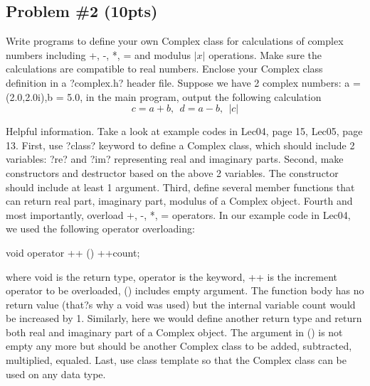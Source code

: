 \documentclass{article}
\begin{document}
\begin{framed} \vspace{-.2in}
\section*{Problem \#2 (10pts)}
Write programs to define your own Complex class for calculations of complex numbers including +, -, *, = and modulus $|x|$ operations. Make sure the calculations are compatible to real numbers. Enclose your Complex class definition in a ?complex.h? header file. Suppose we have 2 complex numbers: a = (2.0,2.0i),b = 5.0, in the main program, output the following calculation
$$c = a + b, ~~ d = a - b, ~~ |c| $$

Helpful information. Take a look at example codes in Lec04, page 15, Lec05, page 13.
First, use ?class? keyword to define a Complex class, which should include 2 variables: ?re? and ?im? representing real and imaginary parts. Second, make constructors and destructor based on the above 2 variables. The constructor should include at least 1 argument. Third, define several member functions that can return real part, imaginary part, modulus of a Complex object.
Fourth and most importantly, overload +, -, *, = operators. In our example code in Lec04, we used the following operator overloading:
\begin{center}
void operator ++ () {++count;}
\end{center}
where void is the return type, operator is the keyword, ++ is the increment operator to be overloaded, () includes empty argument. The function body has no return value (that?s why a void was used) but the internal variable count would be increased by 1.
Similarly, here we would define another return type and return both real and imaginary part of a Complex object. The argument in () is not empty any more but should be another Complex class to be added, subtracted, multiplied, equaled.
Last, use class template so that the Complex class can be used on any data type.

\end{framed}
\end{document}
